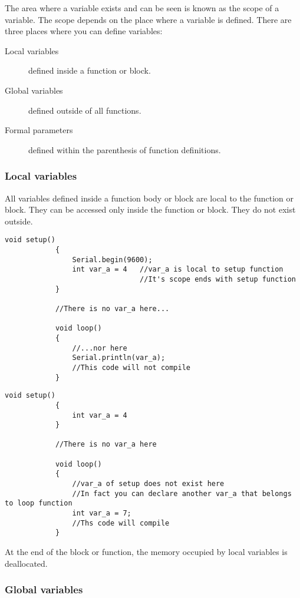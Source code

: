 \documentclass{article}
\begin{document}
			The area where a variable exists and can be seen is known as the scope of a variable. The scope depends on the place where a variable is defined. There are three places where you can define variables:

			\begin{description}
			\item[Local variables] defined inside a function or block.
			\item[Global variables] defined outside of all functions.
			\item[Formal parameters] defined within the parenthesis of function definitions.
			\end{description}

		\subsubsection{Local variables}

			All variables defined inside a function body or block are local to the function or block. They can be accessed only inside the function or block. They do not exist outside.

			\begin{lstlisting}[gobble=12]
			void setup()
			{
				Serial.begin(9600);
				int var_a = 4	//var_a is local to setup function
								//It's scope ends with setup function
			}

			//There is no var_a here...

			void loop()
			{
				//...nor here
				Serial.println(var_a);
				//This code will not compile
			}
			\end{lstlisting}

			\begin{lstlisting}[gobble=12]
			void setup()
			{
				int var_a = 4
			}

			//There is no var_a here

			void loop()
			{
				//var_a of setup does not exist here
				//In fact you can declare another var_a that belongs to loop function
				int var_a = 7;
				//Ths code will compile
			}
			\end{lstlisting}

			At the end of the block or function, the memory occupied by local variables is deallocated.

		\subsubsection{Global variables}
\end{document}
